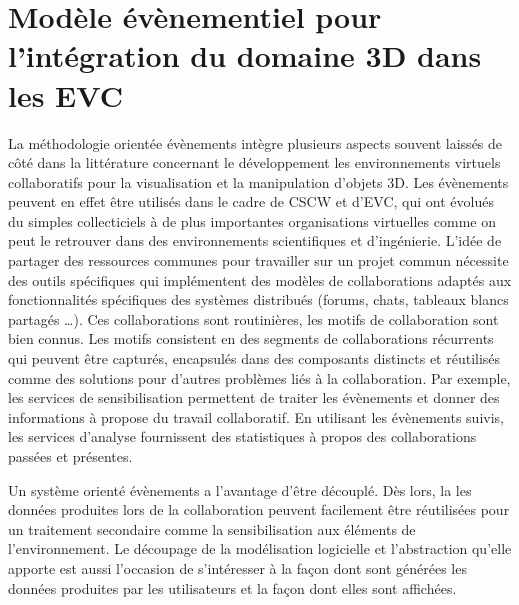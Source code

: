 
\section{Modèle évènementiel pour l'intégration du domaine 3D dans les 
EVC}

La méthodologie orientée évènements intègre plusieurs aspects souvent laissés 
de côté dans la littérature concernant le développement les environnements 
virtuels collaboratifs pour la visualisation et la manipulation d'objets 3D. 
Les évènements peuvent en effet être utilisés dans le cadre de \gls{CSCW} et 
d'\gls{EVC}, qui ont évolués du simples collecticiels à de plus importantes 
organisations virtuelles comme on peut le retrouver dans des environnements 
scientifiques et d'ingénierie. L'idée de partager des ressources communes pour 
travailler sur un projet commun nécessite des outils spécifiques qui implémentent 
des modèles de collaborations adaptés aux fonctionnalités spécifiques des 
systèmes distribués (forums, chats, tableaux blancs partagés \dots). Ces 
collaborations sont routinières, les motifs de collaboration sont bien connus. Les 
motifs consistent en des segments de collaborations récurrents qui peuvent être 
capturés, encapsulés dans des composants distincts et réutilisés comme des 
solutions pour d'autres problèmes liés à la collaboration. Par exemple, les services 
de sensibilisation permettent de traiter les évènements et donner des informations 
à propose du travail collaboratif. En utilisant les évènements suivis, les services 
d'analyse fournissent des statistiques à propos des collaborations passées et 
présentes.


Un système orienté évènements a l'avantage d'être découplé. Dès 
lors, la les données produites lors de la collaboration peuvent facilement être 
réutilisées pour un traitement secondaire comme la sensibilisation aux éléments 
de l'environnement. 
Le découpage de la modélisation logicielle et l'abstraction qu'elle apporte est aussi 
l'occasion de s'intéresser à la façon dont sont générées les données produites par 
les utilisateurs et la façon dont elles sont affichées. 

